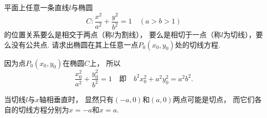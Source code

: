 \begin{example}\label{example:平面解析几何.椭圆的切线}
平面上任意一条直线\(l\)与椭圆\begin{equation*}
	C: \frac{x^2}{a^2} + \frac{y^2}{b^2} = 1 \quad(a>b>1)
\end{equation*}
的位置关系要么是相交于两点（称\(l\)为割线），
要么是相切于一点（称\(l\)为切线），要么没有公共点.
请求出椭圆在其上任意一点\(P_0(x_0,y_0)\)处的切线方程.
\begin{solution}
因为点\(P_0(x_0,y_0)\)在椭圆\(C\)上，
所以\begin{equation*}
	\frac{x_0^2}{a^2} + \frac{y_0^2}{b^2} = 1
	\quad\text{即}\quad
	b^2 x_0^2 + a^2 y_0^2 = a^2 b^2.
\end{equation*}

当切线\(l\)与\(x\)轴相垂直时，
显然只有\((-a,0)\)和\((a,0)\)两点可能是切点，
而它们各自的切线方程分别为\(x=-a\)和\(x=a\).


\end{solution}
\end{example}
